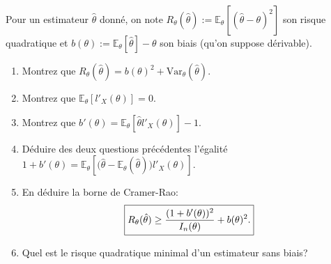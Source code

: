 \documentclass[a4paper,11pt,fleqn]{article}
\newcommand{\E}{\ensuremath{\mathbb{E}}}
\newcommand{\1}{\ensuremath{\mathbbm{1}}}
\newcommand{\cro}[1]{\left[#1\right]}
\begin{document}
Pour un estimateur $\hat \theta$ donn\'e, on note $R_{\theta}(\hat\theta):=\E_{\theta}\cro{(\hat\theta-\theta)^2}$ son risque quadratique et $b(\theta):=\E_{\theta}[\hat\theta]-\theta$ son biais (qu'on suppose d\'erivable).
\begin{enumerate}
\item Montrez que $R_{\theta}(\hat\theta)=b(\theta)^2+\textrm{Var}_{\theta}(\hat\theta)$.
\item Montrez que $\E_{\theta}\cro{l'_{X}(\theta)}=0$.
\item Montrez que $b'(\theta)=\E_{\theta}\cro{\hat\theta l'_{X}(\theta)}-1$.
\item D\'eduire des deux questions pr\'ec\'edentes l'\'egalit\'e
  $1+b'(\theta)=\E_{\theta}\cro{\big(\hat\theta-\E_{\theta}(\hat\theta)\big)l'_{X}(\theta)}$.
\item En d\'eduire la borne de Cramer-Rao:
$$\boxed{R_{\theta}(\hat\theta)\geq {(1+b'(\theta))^2\over I_{n}(\theta)}+b(\theta)^2.}$$
\item Quel est le risque quadratique minimal d'un estimateur sans biais?
\end{enumerate}
\end{document}
